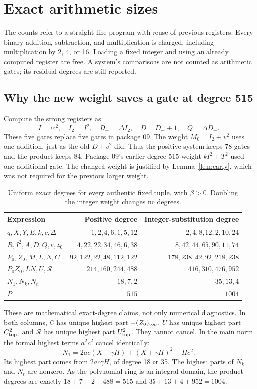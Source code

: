 \documentclass[11pt]{article}
\theoremstyle{definition}\newtheorem{definition}[theorem]{Definition}
\theoremstyle{remark}\newtheorem{remark}[theorem]{Remark}
\newcommand{\Res}{\mathcal R}\newcommand{\pc}{\operatorname{pc}}
\begin{document}
\section{Exact arithmetic sizes}
\label{sec:degree}
The counts refer to a straight-line program with reuse of previous registers. Every binary addition, subtraction, and multiplication is charged, including multiplication by 2, 4, or 16. Loading a fixed integer and using an already computed register are free. A system's comparisons are not counted as arithmetic gates; its residual degrees are still reported.

\subsection{Why the new weight saves a gate at degree 515}
Compute the strong registers as
\[
I=ic^2,\quad I_2=I^2,\quad D_-=\Delta I_2,
\quad D=D_-+1,\quad Q=\Delta D_-.
\]
These five gates replace five gates in package 09. The weight $M_0=I_2+v^2$ uses one addition, just as the old $D+v^2$ did. Thus the positive system keeps 78 gates and the product keeps 84. Package 09's earlier degree-515 weight $kI^2+T^2$ used one additional gate. The changed weight is justified by Lemma~\ref{lem:early}, which was not required for the previous larger weight.

\begin{table}[ht]
\centering\small
\begin{tabular}{@{}lrr@{}}
\toprule
Expression & Positive degree & Integer-substitution degree\\
\midrule
$q,X,Y,E,k,c,\Delta$ & $1,2,4,6,1,5,12$ & $2,4,8,12,2,10,24$\\
$R,I^2,A,D,Q,v,z_0$ & $4,22,22,34,46,6,38$ & $8,42,44,66,90,11,74$\\
$P_0,Z_0,M,L,N,C$ & $92,122,22,48,112,122$ & $178,238,42,92,218,238$\\
$P_0Z_0,LN,U,\Res$ & $214,160,244,488$ & $416,310,476,952$\\
$N_1,N_k,N_t$ & $18,7,2$ & $35,13,4$\\
$P$ & $515$ & $1004$\\
\bottomrule
\end{tabular}
\caption{Uniform exact degrees for every authentic fixed tuple, with $\beta>0$. Doubling the integer weight changes no degrees.}
\label{tab:degrees}
\end{table}

These are mathematical exact-degree claims, not only numerical diagnostics. In both columns, $C$ has unique highest part $-(Z_0)_{\rm top}$, $U$ has unique highest part $C_{\rm top}^2$, and $\Res$ has unique highest part $U_{\rm top}^2$. They cannot cancel. In the main norm the formal highest terms $a^2c^2$ cancel identically:
\[
N_1=2ac(X+\gamma H)+(X+\gamma H)^2-Hc^2.
\]
Its highest part comes from $2ac\gamma H$, of degree 18 or 35. The highest parts of $N_k$ and $N_t$ are nonzero. As the polynomial ring is an integral domain, the product degrees are exactly $18+7+2+488=515$ and $35+13+4+952=1004$.
\end{document}
